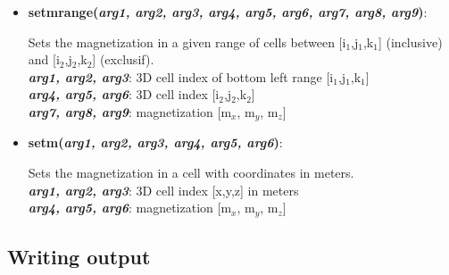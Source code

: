 \begin{itemize}
 \item {\vspace{-0.4cm}\textbf{setmrange(\textit{arg1, arg2, arg3, arg4, arg5, arg6, arg7, arg8, arg9})}:
				\flushright\parbox{0.9 \textwidth}{\vspace{-0.25cm} 
				Sets the magnetization in a given range of cells between [i$_1$,j$_1$,k$_1$] (inclusive) and [i$_2$,j$_2$,k$_2$] (exclusif).\\
				\textbf{\textit{arg1, arg2, arg3}}: 3D cell index of bottom left range [i$_1$,j$_1$,k$_1$]\\
				\textbf{\textit{arg4, arg5, arg6}}: 3D cell index [i$_2$,j$_2$,k$_2$]\\
				\textbf{\textit{arg7, arg8, arg9}}: magnetization [m$_x$, m$_y$, m$_z$]
				}\flushleft}

 \item {\vspace{-0.4cm}\textbf{setm(\textit{arg1, arg2, arg3, arg4, arg5, arg6})}:
				\flushright\parbox{0.9 \textwidth}{\vspace{-0.25cm} 
				Sets the magnetization in a cell with coordinates in meters.\\
				\textbf{\textit{arg1, arg2, arg3}}: 3D cell index [x,y,z] in meters\\
				\textbf{\textit{arg4, arg5, arg6}}: magnetization [m$_x$, m$_y$, m$_z$]
				}\flushleft}

\end{itemize}


\subsection{Writing output}

